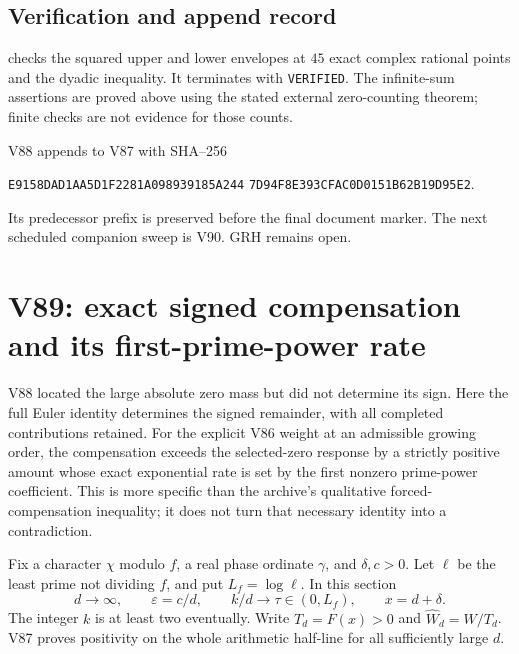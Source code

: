 \documentclass[11pt]{article}
\theoremstyle{definition}
\theoremstyle{remark}
\begin{document}
\subsection*{Verification and append record}

 checks the squared
upper and lower envelopes at \(45\) exact complex rational points and
the dyadic inequality.  It terminates with \texttt{VERIFIED}.  The
infinite-sum assertions are proved above using the stated external
zero-counting theorem; finite checks are not evidence for those counts.

V88 appends to V87 with SHA--256
\begin{center}
\texttt{E9158DAD1AA5D1F2281A098939185A244}\allowbreak
\texttt{7D94F8E393CFAC0D0151B62B19D95E2}.
\end{center}
Its predecessor prefix is preserved before the final document marker.
The next scheduled companion sweep is V90.  GRH remains open.
\endgroup


\clearpage
\section{V89: exact signed compensation and its first-prime-power rate}
\label{sec:f2v89-compensation}
\begingroup
\setcounter{equation}{0}
\renewcommand{\theequation}{N89.\arabic{equation}}
\renewcommand{\theHequation}{f2v89.\arabic{equation}}

V88 located the large absolute zero mass but did not determine its sign.
Here the full Euler identity determines the signed remainder, with all
completed contributions retained.  For the explicit V86 weight at an
admissible growing order, the compensation exceeds the selected-zero
response by a strictly positive amount whose exact exponential rate is
set by the first nonzero prime-power coefficient.  This is more specific
than the archive's qualitative forced-compensation inequality; it does
not turn that necessary identity into a contradiction.

Fix a character \(\chi\) modulo \(f\), a real phase ordinate \(\gamma\),
and \(\delta,c>0\).  Let \(\ell\) be the least prime not dividing
\(f\), and put \(L_f=\log\ell\).  In this section
\begin{equation}
 d\longrightarrow\infty,\qquad \varepsilon=c/d,\qquad
 k/d\longrightarrow\tau\in(0,L_f),\qquad x=d+\delta.
 \label{eq:f2v89-regime}
\end{equation}
The integer \(k\) is at least two eventually.  Write
\(T_d=F(x)>0\) and \(\widehat W_d=W/T_d\).  V87 proves positivity
on the whole arithmetic half-line for all sufficiently large \(d\).
\end{document}
